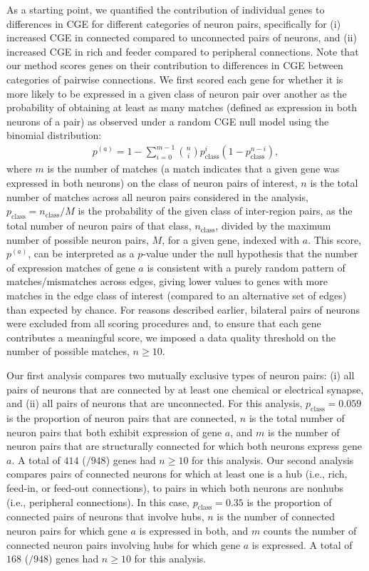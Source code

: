 As a starting point, we quantified the contribution of individual genes to differences in CGE for different categories of neuron pairs, specifically for (i) increased CGE in connected compared to unconnected pairs of neurons, and (ii) increased CGE in rich and feeder compared to peripheral connections.
Note that our method scores genes on their contribution to differences in CGE between categories of pairwise connections.
We first scored each gene for whether it is more likely to be expressed in a given class of neuron pair over another as the probability of obtaining at least as many matches (defined as expression in both neurons of a pair) as observed under a random CGE null model using the binomial distribution:
\begin{eqnarray}
	\label{eq:CBinomialProbability}
     p^{(a)} = 1 - \sum_{i=0}^{m-1}\binom{n}{i} p_\mathrm{class}^{i}(1-p_\mathrm{class}^{n-i}),
\end{eqnarray}
where $m$ is the number of matches (a match indicates that a given gene was expressed in both neurons) on the class of neuron pairs of interest, $n$ is the total number of matches across all neuron pairs considered in the analysis, $p_\mathrm{class} = n_\mathrm{class}/M$ is the probability of the given class of inter-region pairs, as the total number of neuron pairs of that class, $n_\mathrm{class}$, divided by the maximum number of possible neuron pairs, $M$, for a given gene, indexed with $a$.
This score, $p^{(a)}$, can be interpreted as a $p$-value under the null hypothesis that the number of expression matches of gene $a$ is consistent with a purely random pattern of matches/mismatches across edges, giving lower values to genes with more matches in the edge class of interest (compared to an alternative set of edges) than expected by chance.
For reasons described earlier, bilateral pairs of neurons were excluded from all scoring procedures and, to ensure that each gene contributes a meaningful score, we imposed a data quality threshold on the number of possible matches, $n \geq 10$.

Our first analysis compares two mutually exclusive types of neuron pairs:
(i) all pairs of neurons that are connected by at least one chemical or electrical synapse, and
(ii) all pairs of neurons that are unconnected.
For this analysis, $p_\mathrm{class} = 0.059$ is the proportion of neuron pairs that are connected, $n$ is the total number of neuron pairs that both exhibit expression of gene $a$, and $m$ is the number of neuron pairs that are structurally connected for which both neurons express gene $a$.
A total of $414$ ($/948$) genes had $n \geq 10$ for this analysis.
Our second analysis compares pairs of connected neurons for which at least one is a hub (i.e., rich, feed-in, or feed-out connections), to pairs in which both neurons are nonhubs (i.e., peripheral connections).
In this case, $p_\mathrm{class} = 0.35$ is the proportion of connected pairs of neurons that involve hubs, $n$ is the number of connected neuron pairs for which gene $a$ is expressed in both, and $m$ counts the number of connected neuron pairs involving hubs for which gene $a$ is expressed.
A total of $168$ ($/948$) genes had $n \geq 10$ for this analysis.

